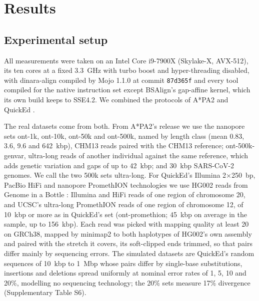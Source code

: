 \section{Results}

\subsection{Experimental setup}

All measurements were taken on an Intel Core i9-7900X (Skylake-X, AVX-512), its ten cores at a fixed 3.3~GHz with turbo boost and hyper-threading disabled, with dinara-align compiled by Mojo 1.1.0 \citep{Modular2025mojo} at commit \texttt{87d365f} and every tool compiled for the native instruction set except BSAlign's gap-affine kernel, which its own build keeps to SSE4.2. We combined the protocols of A*PA2 \citep{GrootKoerkamp2024astarpa2} and QuickEd \citep{Doblas2025quicked}.

The real datasets come from both. From A*PA2's release \citep{GrootKoerkamp2024pabench} we use the nanopore sets ont-1k, ont-10k, ont-50k and ont-500k, named by length class (mean 0.83, 3.6, 9.6 and 642~kbp), CHM13 reads paired with the CHM13 reference; ont-500k-genvar, ultra-long reads of another individual against the same reference, which adds genetic variation and gaps of up to 42~kbp; and 30~kbp SARS-CoV-2 genomes. We call the two 500k sets ultra-long. For QuickEd's Illumina 2$\times$250~bp, PacBio HiFi and nanopore PromethION technologies we use HG002 reads from Genome in a Bottle \citep{Zook2016giab}: Illumina and HiFi reads of one region of chromosome 20, and UCSC's ultra-long PromethION reads \citep{Shafin2020shasta} of one region of chromosome 12, of 10~kbp or more as in QuickEd's set (ont-promethion; 45~kbp on average in the sample, up to 156~kbp). Each read was picked with mapping quality at least 20 on GRCh38, mapped by minimap2 \citep{Li2018minimap2} to both haplotypes of HG002's own assembly \citep{Hansen2025hg002} and paired with the stretch it covers, its soft-clipped ends trimmed, so that pairs differ mainly by sequencing errors. The simulated datasets are QuickEd's random sequences \citep{Doblas2024datasets} of 10~kbp to 1~Mbp whose pairs differ by single-base substitutions, insertions and deletions spread uniformly at nominal error rates of 1, 5, 10 and 20\%, modelling no sequencing technology; the 20\% sets measure 17\% divergence (Supplementary Table S6).


